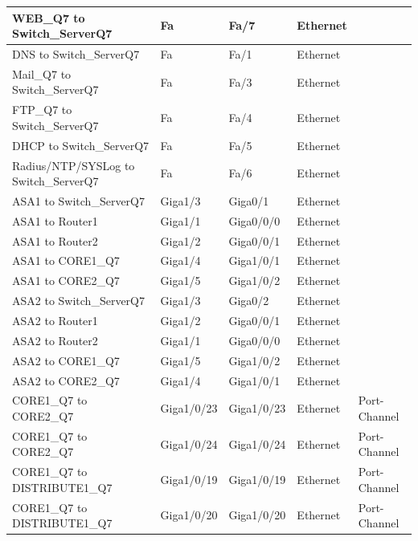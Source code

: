 \documentclass[a4paper, 12pt]{article}
\begin{document}
\begin{center}
\begin{longtable}{|p{}|p{}|p{}|p{}|p{}|}
\hline WEB\_Q7 to Switch\_ServerQ7     &     Fa     &     Fa/7    &  Ethernet  &   \\
\hline DNS to Switch\_ServerQ7        &     Fa     &     Fa/1    &  Ethernet  &   \\
\hline Mail\_Q7 to Switch\_ServerQ7     &     Fa     &     Fa/3    &  Ethernet  &   \\
\hline FTP\_Q7 to Switch\_ServerQ7     &     Fa     &     Fa/4    &  Ethernet  &   \\
\hline DHCP to Switch\_ServerQ7        &     Fa     &     Fa/5    &  Ethernet  &   \\
\hline Radius/NTP/SYSLog to Switch\_ServerQ7      &     Fa     &     Fa/6    &  Ethernet  &   \\
\hline ASA1 to Switch\_ServerQ7       &     Giga1/3     &     Giga0/1    &  Ethernet  &   \\
\hline ASA1 to Router1                &     Giga1/1     &     Giga0/0/0    &  Ethernet  &   \\
\hline ASA1 to Router2                &     Giga1/2     &     Giga0/0/1    &  Ethernet  &   \\
\hline ASA1 to CORE1\_Q7              &     Giga1/4     &     Giga1/0/1    &  Ethernet  &   \\
\hline ASA1 to CORE2\_Q7              &     Giga1/5     &     Giga1/0/2    &  Ethernet  &   \\
\hline ASA2 to Switch\_ServerQ7        &     Giga1/3     &     Giga0/2    &  Ethernet  &   \\
\hline ASA2 to Router1               &     Giga1/2     &     Giga0/0/1    &  Ethernet  &   \\
\hline ASA2 to Router2               &     Giga1/1     &     Giga0/0/0    &  Ethernet  &   \\
\hline ASA2 to CORE1\_Q7               &     Giga1/5     &     Giga1/0/2    &  Ethernet  &   \\
\hline ASA2 to CORE2\_Q7              &     Giga1/4     &     Giga1/0/1    &  Ethernet  &   \\
\hline CORE1\_Q7 to CORE2\_Q7         &     Giga1/0/23     &     Giga1/0/23    &  Ethernet  &  Port-Channel  \\
\hline CORE1\_Q7 to CORE2\_Q7           &     Giga1/0/24     &     Giga1/0/24    &  Ethernet  &  Port-Channel  \\
\hline CORE1\_Q7 to DISTRIBUTE1\_Q7     &     Giga1/0/19     &     Giga1/0/19    &  Ethernet  &  Port-Channel  \\
\hline CORE1\_Q7 to DISTRIBUTE1\_Q7     &     Giga1/0/20     &     Giga1/0/20    &  Ethernet  &  Port-Channel  \\

\end{longtable}
\end{center}
\end{document}
